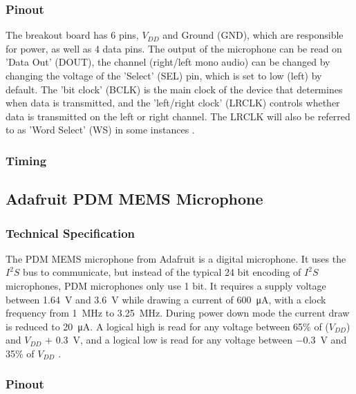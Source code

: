 \subsubsection{Pinout}

The breakout board has 6 pins, $V_{DD}$ and Ground (GND), which are responsible for power, as well as 4 data pins.
The output of the microphone can be read on 'Data Out' (DOUT), the channel (right/left mono audio) can be changed by
changing the voltage of the 'Select' (SEL) pin, which is set to low (left) by default.
The 'bit clock' (BCLK) is the main clock of the device that determines when data is transmitted, and the 'left/right clock' (LRCLK)
controls whether data is transmitted on the left or right channel.
The LRCLK will also be referred to as 'Word Select' (WS) in some instances \cite{i2s_mic_pinout}.

\subsubsection{Timing}


\subsection{Adafruit PDM MEMS Microphone}

\subsubsection{Technical Specification}

The PDM MEMS microphone from Adafruit \cite{pdm_mic} is a digital microphone.
It uses the $I^2S$ bus to communicate, but instead of the typical 24 bit encoding of $I^2S$ microphones, PDM microphones only use 1 bit.
It requires a supply voltage between \SI{1.64}{\volt} and \SI{3.6}{\volt} while drawing a current of \SI{600}{\micro\ampere}, with a clock
frequency from \SI{1}{\mega\hertz} to \SI{3.25}{\mega\hertz}.
During power down mode the current draw is reduced to \SI{20}{\micro\ampere}.
A logical high is read for any voltage between 65\% of ($V_{DD}$) and $V_{DD}$ + \SI{0.3}{\volt},
and a logical low is read for any voltage between \SI{-0.3}{\volt} and 35\% of $V_{DD}$ \cite{pdm_mic_datasheet}.

\subsubsection{Pinout}

